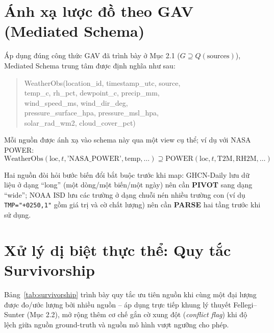 \documentclass[12pt,a4paper]{report}
\begin{document}
\section{Ánh xạ lược đồ theo GAV (Mediated Schema)}

Áp dụng đúng công thức GAV đã trình bày ở Mục 2.1 ($G \supseteq Q(\text{sources})$), Mediated Schema trung tâm được định nghĩa như sau:

\begin{quote}
\ttfamily\footnotesize
WeatherObs(location\_id, timestamp\_utc, source,\\
\hspace*{1.2cm} temp\_c, rh\_pct, dewpoint\_c, precip\_mm,\\
\hspace*{1.2cm} wind\_speed\_ms, wind\_dir\_deg,\\
\hspace*{1.2cm} pressure\_surface\_hpa, pressure\_msl\_hpa,\\
\hspace*{1.2cm} solar\_rad\_wm2, cloud\_cover\_pct)
\end{quote}

Mỗi nguồn được ánh xạ vào schema này qua một view cụ thể; ví dụ với NASA POWER:
$$\text{WeatherObs}(\text{loc},t,\text{'NASA\_POWER'},\text{temp},\ldots) \supseteq \text{POWER}(\text{loc},t,\text{T2M},\text{RH2M},\ldots)$$

Hai nguồn đòi hỏi bước biến đổi bắt buộc trước khi map: GHCN-Daily lưu dữ liệu ở dạng ``long'' (một dòng/một biến/một ngày) nên cần \textbf{PIVOT} sang dạng ``wide''; NOAA ISD lưu các trường ở dạng chuỗi nén nhiều trường con (ví dụ \texttt{TMP="+0250,1"} gồm giá trị và cờ chất lượng) nên cần \textbf{PARSE} hai tầng trước khi sử dụng.

\section{Xử lý dị biệt thực thể: Quy tắc Survivorship}

Bảng~\ref{tab:survivorship} trình bày quy tắc ưu tiên nguồn khi cùng một đại lượng được đo/ước lượng bởi nhiều nguồn -- áp dụng trực tiếp khung lý thuyết Fellegi--Sunter (Mục 2.2), mở rộng thêm cơ chế gắn cờ xung đột (\emph{conflict flag}) khi độ lệch giữa nguồn ground-truth và nguồn mô hình vượt ngưỡng cho phép.
\end{document}
